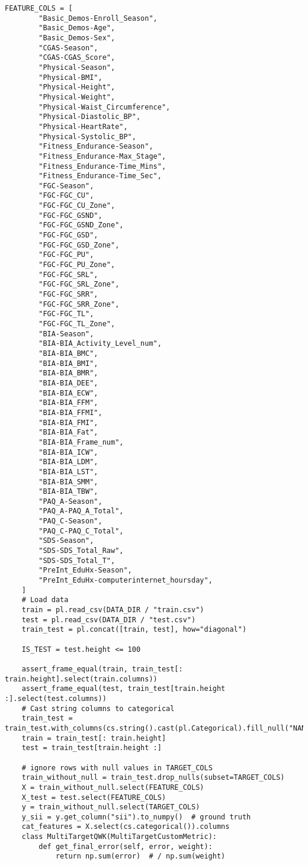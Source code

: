 \begin{appendices}
\begin{mdframed}
\begin{lstlisting}[breaklines=true]
    FEATURE_COLS = [
        "Basic_Demos-Enroll_Season",
        "Basic_Demos-Age",
        "Basic_Demos-Sex",
        "CGAS-Season",
        "CGAS-CGAS_Score",
        "Physical-Season",
        "Physical-BMI",
        "Physical-Height",
        "Physical-Weight",
        "Physical-Waist_Circumference",
        "Physical-Diastolic_BP",
        "Physical-HeartRate",
        "Physical-Systolic_BP",
        "Fitness_Endurance-Season",
        "Fitness_Endurance-Max_Stage",
        "Fitness_Endurance-Time_Mins",
        "Fitness_Endurance-Time_Sec",
        "FGC-Season",
        "FGC-FGC_CU",
        "FGC-FGC_CU_Zone",
        "FGC-FGC_GSND",
        "FGC-FGC_GSND_Zone",
        "FGC-FGC_GSD",
        "FGC-FGC_GSD_Zone",
        "FGC-FGC_PU",
        "FGC-FGC_PU_Zone",
        "FGC-FGC_SRL",
        "FGC-FGC_SRL_Zone",
        "FGC-FGC_SRR",
        "FGC-FGC_SRR_Zone",
        "FGC-FGC_TL",
        "FGC-FGC_TL_Zone",
        "BIA-Season",
        "BIA-BIA_Activity_Level_num",
        "BIA-BIA_BMC",
        "BIA-BIA_BMI",
        "BIA-BIA_BMR",
        "BIA-BIA_DEE",
        "BIA-BIA_ECW",
        "BIA-BIA_FFM",
        "BIA-BIA_FFMI",
        "BIA-BIA_FMI",
        "BIA-BIA_Fat",
        "BIA-BIA_Frame_num",
        "BIA-BIA_ICW",
        "BIA-BIA_LDM",
        "BIA-BIA_LST",
        "BIA-BIA_SMM",
        "BIA-BIA_TBW",
        "PAQ_A-Season",
        "PAQ_A-PAQ_A_Total",
        "PAQ_C-Season",
        "PAQ_C-PAQ_C_Total",
        "SDS-Season",
        "SDS-SDS_Total_Raw",
        "SDS-SDS_Total_T",
        "PreInt_EduHx-Season",
        "PreInt_EduHx-computerinternet_hoursday",
    ]
    # Load data
    train = pl.read_csv(DATA_DIR / "train.csv")
    test = pl.read_csv(DATA_DIR / "test.csv")
    train_test = pl.concat([train, test], how="diagonal")

    IS_TEST = test.height <= 100

    assert_frame_equal(train, train_test[: train.height].select(train.columns))
    assert_frame_equal(test, train_test[train.height :].select(test.columns))
    # Cast string columns to categorical
    train_test = train_test.with_columns(cs.string().cast(pl.Categorical).fill_null("NAN"))
    train = train_test[: train.height]
    test = train_test[train.height :]

    # ignore rows with null values in TARGET_COLS
    train_without_null = train_test.drop_nulls(subset=TARGET_COLS)
    X = train_without_null.select(FEATURE_COLS)
    X_test = test.select(FEATURE_COLS)
    y = train_without_null.select(TARGET_COLS)
    y_sii = y.get_column("sii").to_numpy()  # ground truth
    cat_features = X.select(cs.categorical()).columns
    class MultiTargetQWK(MultiTargetCustomMetric):
        def get_final_error(self, error, weight):
            return np.sum(error)  # / np.sum(weight)


\end{lstlisting}
\end{mdframed}
\end{appendices}
